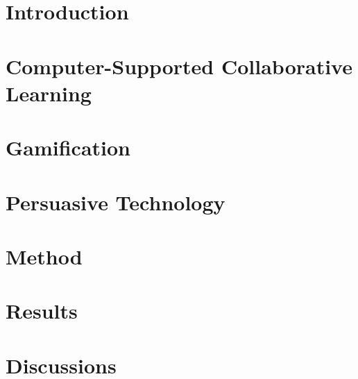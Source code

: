 \documentclass[doutorado, pre-defesa, brazil, english]{packages/icmc}
\begin{document}
\textual

\chapter{Introduction}
\label{chapter:introducao}


\chapter{Computer-Supported Collaborative Learning}
\label{chapter:background-cscl}


\chapter{Gamification}
\label{chapter:gamification}


\chapter{Persuasive Technology}
\label{chapter:persuasive-techonology}


\chapter{Method}
\label{chapter:method}


\chapter{Results}
\label{chapter:results}


\chapter{Discussions}
\label{chapter:discussions}




% 

\postextual


\end{document}
